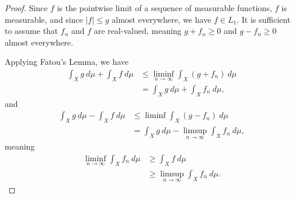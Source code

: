 \documentclass[10pt]{mypackage}
\begin{document}
\begin{proof}
  Since $f$ is the pointwise limit of a sequence of measurable functions, $f$ is measurable, and since $\left\vert f \right\vert \leq g$ almost everywhere, we have $f\in L_1$. It is sufficient to assume that $f_n$ and $f$ are real-valued, meaning $g + f_n \geq 0$ and $g - f_n\geq 0$ almost everywhere.\newline

  Applying Fatou's Lemma, we have
  \begin{align*}
    \int_{X}^{} g\:d\mu + \int_{X}^{}f\:d\mu &\leq \liminf_{n\rightarrow\infty} \int_{X}^{} \left(g + f_n\right)\:d\mu\\
                                             &= \int_{X}^{} g\:d\mu + \int_{X}^{} f_n\:d\mu,
  \end{align*}
  and
  \begin{align*}
    \int_{X}^{} g\:d\mu - \int_{X}^{} f\:d\mu &\leq \liminf \int_{X}^{} \left( g-f_n \right)\:d\mu\\
                                              &= \int_{X}^{} g\:d\mu - \limsup_{n\rightarrow\infty} \int_{X}^{} f_n\:d\mu,
  \end{align*}
  meaning
  \begin{align*}
    \liminf_{n\rightarrow\infty} \int_{X}^{} f_n\:d\mu &\geq \int_{X}^{} f\:d\mu\\
                                                       &\geq \limsup_{n\rightarrow\infty}\int_{X}^{} f_n\:d\mu.
  \end{align*}
  
\end{proof}
\end{document}
